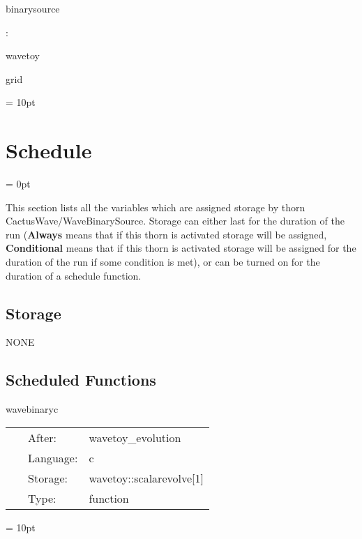 \documentclass{article}
\begin{document}
binarysource
\vspace{2mm}

: 

wavetoy

grid
\vspace{2mm}

\vspace{5mm}\parskip = 10pt 

\section{Schedule} 


\parskip = 0pt


\noindent This section lists all the variables which are assigned storage by thorn CactusWave/WaveBinarySource.  Storage can either last for the duration of the run ({\bf Always} means that if this thorn is activated storage will be assigned, {\bf Conditional} means that if this thorn is activated storage will be assigned for the duration of the run if some condition is met), or can be turned on for the duration of a schedule function.


\subsection*{Storage}NONE
\subsection*{Scheduled Functions}
\vspace{5mm}


\hspace{5mm} wavebinaryc 

\hspace{5mm}{\it provide binary source during evolution (c) } 


\hspace{5mm}

 \begin{tabular*}{160mm}{cll} 
~ & After:  & wavetoy\_evolution \\ 
~ & Language:  & c \\ 
~ & Storage:  & wavetoy::scalarevolve[1] \\ 
~ & Type:  & function \\ 
\end{tabular*} 



\vspace{5mm}\parskip = 10pt 
\end{document}
